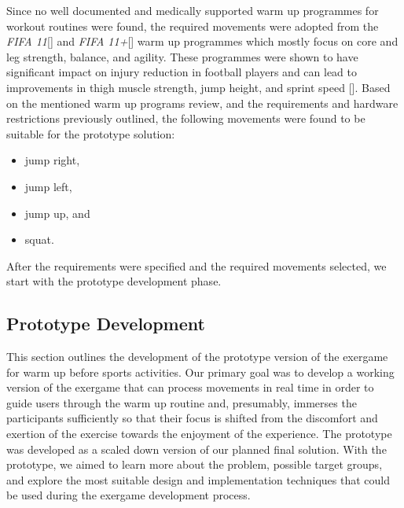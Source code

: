 Since no well documented and medically supported warm up programmes for workout routines were found,  the required movements were adopted from the 
\textit{FIFA 11}[] and \textit{FIFA 11+}[] warm up programmes which mostly focus on core and leg strength, balance, and agility. These programmes were shown to have significant impact on injury reduction in football players and can lead to improvements in thigh muscle strength, jump height, and sprint speed []. %
Based on the mentioned warm up programs review, and the requirements and hardware restrictions previously outlined, the following movements were found to be suitable for the prototype solution: 
\begin{itemize}
\item jump right,
\item jump left,
\item jump up, and
\item squat.
\end{itemize}
After the requirements were specified and the required movements selected, we start with the prototype development phase.
\subsection{Prototype Development}
This section outlines the development of the prototype version of the exergame for warm up before sports activities. Our primary goal was to develop a working version of the exergame that can process movements in real time in order to guide users through the warm up routine and, presumably, immerses the participants sufficiently so that their focus is shifted from the discomfort and exertion of the exercise towards the enjoyment of the experience. The prototype was developed as a scaled down version of our planned final solution. With the prototype, we aimed to learn more about the problem, possible target groups, and explore the most suitable design and implementation techniques that could be used during the exergame development process. 
